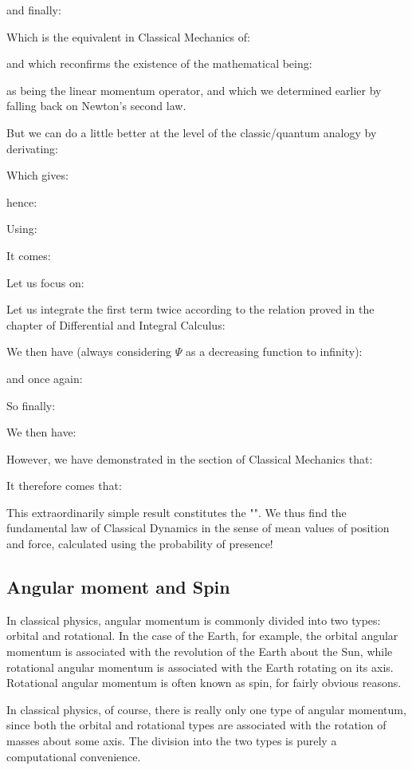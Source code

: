	and finally:
	
	Which is the equivalent in Classical Mechanics of:
	
	and which reconfirms the existence of the mathematical being:
	
	as being the linear momentum operator, and which we determined earlier by falling back on Newton's second law.

	But we can do a little better at the level of the classic/quantum analogy by derivating:
	
	Which gives:
	
	hence:
	
	Using:
	
	It comes:
	
	Let us focus on:
	
	Let us integrate the first term twice according to the relation proved in the chapter of Differential and Integral Calculus:
	
	We then have (always considering $\Psi$ as a decreasing function to infinity):
	
	and once again:
	
	So finally:
	
	We then have:
	
	However, we have demonstrated in the section of Classical Mechanics that:
	
	It therefore comes that:
	
	This extraordinarily simple result constitutes the "". We thus find the fundamental law of Classical Dynamics in the sense of mean values of position and force, calculated using the probability of presence!
	
	\pagebreak
	\subsection{Angular moment and Spin}
	In classical physics, angular momentum is commonly divided into two types: orbital and rotational. In the case of the Earth, for example, the orbital angular momentum is associated with the revolution of the Earth about the Sun, while rotational angular momentum is associated with the Earth rotating on its axis. Rotational angular momentum is often known as spin, for fairly obvious reasons.

	In classical physics, of course, there is really only one type of angular momentum, since both the orbital and rotational types are associated with the rotation of masses about some axis. The division into the two types is purely a computational convenience.
	
